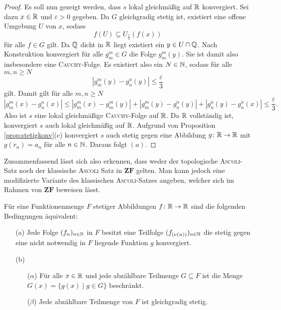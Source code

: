 \begin{proof}
  Es soll nun gezeigt werden, dass $s$ lokal gleichmäßig auf $\mathbb{R}$ konvergiert.
  Sei dazu $x \in \mathbb{R}$ und $\varepsilon > 0$ gegeben.
  Da $G$ gleichgradig stetig ist, existiert eine offene Umgebung $U$ von $x$, sodass
  \begin{displaymath}
    f(U) \subseteq U_\frac{\varepsilon}{3}(f(x))
  \end{displaymath}
  für alle $f \in G$ gilt.
  Da $\mathbb{Q}$ dicht in $\mathbb{R}$ liegt existiert ein $y \in U \cap \mathbb{Q}$.
  Nach Konstruktion konvergiert für alle $g_m^m \in G$ die Folge $g_m^m(y)$.
  Sie ist damit also insbesondere eine \textsc{Cauchy}\hyp{}Folge.
  Es existiert also ein $N \in \mathbb{N}$, sodass für alle $m,n \geq N$
  \begin{displaymath}
    | g_m^m(y) - g_n^n(y) | \leq \frac{\varepsilon}{3}
  \end{displaymath}
  gilt.
  Damit gilt für alle $m, n \geq N$
  \begin{displaymath}
    | g_m^m(x) - g_n^n(x) |
    \leq 
    | g_m^m(x) - g_m^m(y) | +  | g_m^m(y) - g_n^n(y) | +  | g_n^n(y) - g_n^n(x) |
    \leq
    \frac{\varepsilon}{3}.
  \end{displaymath}
  Also ist $s$ eine lokal gleichmäßige \textsc{Cauchy}\hyp{}Folge auf $\mathbb{R}$.
  Da $\mathbb{R}$ vollständig ist, konvergiert $s$ auch lokal gleichmäßig auf $\mathbb{R}$. 
  Aufgrund von Proposition \ref{prop:stetigkonv}(c) konvergiert $s$ auch stetig gegen eine Abbildung $g \colon \mathbb{R} \to \mathbb{R}$ mit $g(r_n) = a_n$ für alle $n \in \mathbb{N}$.
  Daraus folgt $(a)$.
\end{proof}

Zusammenfassend lässt sich also erkennen, dass weder der topologische \textsc{Ascoli}\hyp{}Satz noch der klassische \textsc{Ascoli} Satz in $\mathbf{ZF}$ gelten. Man kann jedoch eine modifizierte Variante des klassischen \textsc{Ascoli}\hyp{}Satzes angeben, welcher sich im Rahmen von $\mathbf{ZF}$ beweisen lässt.

\begin{thm}
  Für eine Funktionenmenge $F$ stetiger Abbildungen $f \colon \mathbb{R} \to \mathbb{R}$ sind die folgenden Bedingungen äquivalent:
  \begin{itemize}
    \item[(a)] Jede Folge $(f_n)_{n \in \mathbb{N}}$ in $F$ besitzt eine Teilfolge $(f_{(\nu(n))})_{n \in \mathbb{N}}$ die stetig gegen eine nicht notwendig in $F$ liegende Funktion $g$ konvergiert.

    \item[(b)]
      \begin{itemize}
        \item[($\alpha$)] Für alle $x \in \mathbb{R}$ und jede abzählbare Teilmenge $G \subseteq F$ ist die Menge $G(x) = \{ g(x) \mid g \in G \}$ beschränkt.
        \item[($\beta$)] Jede abzählbare Teilmenge von $F$ ist gleichgradig stetig.
      \end{itemize}
  \end{itemize}
\end{thm}


